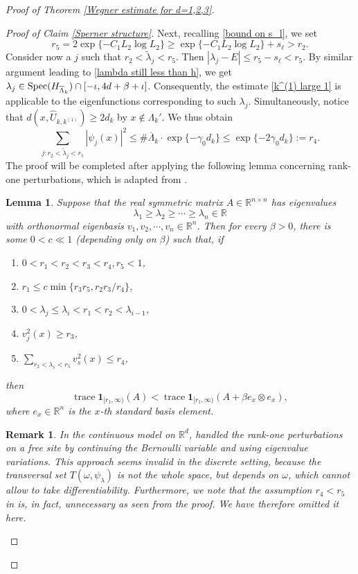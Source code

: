 \documentclass[11pt,reqno,UTF8,twoside]{amsart}
\newcommand{\R}{\mathbb{R}}
\newcommand{\spec}{{\rm Spec}}
\newcommand{\barLambda}{\overline{\Lambda}}
\newcommand{\wtlambda}{\widetilde{\lambda}}
\newtheorem{lem}[thm]{Lemma}
\newtheorem{rmk}{\bf Remark}[section]
\theoremstyle{definition}
\numberwithin{equation}{section}
\begin{document}
\begin{proof}[Proof of Theorem \ref{Wegner estimate for d=1,2,3}]
\begin{proof}[Proof of Claim \ref{Sperner structure}]
Next, recalling \eqref{bound on s_l}, we set 
\begin{equation}\label{r_5}
  r_5= 2\exp\{-C_1 L_2 \log L_2\}\geq \exp\{-C_1 L_2 \log L_2\}+s_\ell > r_2.
\end{equation}
Consider now  a $j$ such that $r_2<\wtlambda_j<r_5$. Then $|\lambda_j-E|\leq r_5-s_{\ell}<r_5$. 
By  similar argument leading  to \eqref{lambda still less than h}, we get   $\lambda_j\in \spec(H_{\barLambda_k})\cap[-\iota,4d+\beta+\iota]$.
Consequently, the estimate \eqref{k^(1) large 1} is applicable to the eigenfunctions corresponding to such $\lambda_j$. Simultaneously, notice that $d(x,\widehat{U}_{k,k^{(1)}})\geq 2d_k$ by $x\notin \Lambda_k'$. We thus obtain 
\begin{equation}\label{r_4}
      \sum_{j:r_2<\wtlambda_j<r_5}|\psi_j(x)|^2 \leq \# \barLambda_k \cdot \exp\{-\gamma_0 d_k\}\leq \exp\{-2\gamma_0 d_k\}:= r_4.
\end{equation}
The proof will be completed after applying the following lemma concerning rank-one perturbations, which is adapted from \cite[Lemma 5.1]{DS20}.
\begin{lem}\label{rank-one perturbation}
Suppose that  the real symmetric matrix \( A \in  \mathbb{R}^{n\times n}  \) has eigenvalues  
\[
\lambda_1 \geq \lambda_2 \geq \cdots \geq \lambda_n \in \mathbb{R}
\]  
with orthonormal eigenbasis \( v_1, v_2, \cdots, v_n \in \mathbb{R}^n \). Then for every $\beta>0$, there is some   $0<c\ll1$ (depending only  on $\beta$) such that, if  
\begin{enumerate}
    \item \(0 < r_1 < r_2 < r_3 < r_4 , r_5 < 1\),  
    \item \(r_1 \leq c \min\{r_3 r_5, r_2 r_3 / r_4\}\),
    \item \(0 < \lambda_j \leq \lambda_i < r_1 < r_2 < \lambda_{i-1}\),  
    \item \(v_{j}^2(x) \geq r_3\),  
    \item \(\displaystyle\sum_{r_2 < \lambda_s < r_5} v_{s}^2(x) \leq r_4\),  
\end{enumerate}
then 
\[
\operatorname{trace} \mathbf{1}_{[r_1, \infty)}(A) < \operatorname{trace} \mathbf{1}_{[r_1, \infty)}(A + \beta e_x \otimes e_x),
\]
where \( e_x \in \mathbb{R}^n \) is the \(x\)-th standard basis element.

\end{lem}
\begin{rmk}
In the continuous model on $\R^d$, \cite{BK05} handled  the rank-one perturbations on a free site by continuing the Bernoulli variable   and   using  eigenvalue variations. This approach seems invalid  in the discrete setting, because the transversal set $T(\omega,\psi_{\lambda})$ is not the whole space, but depends on $\omega$,  which  cannot allow  to take differentiability. 
Furthermore, we note that the assumption $r_4 < r_5$ in \cite[Lemma 5.1]{DS20} is, in fact, unnecessary as seen from the  proof.  We have therefore omitted it here.
\end{rmk}


\end{proof}
\end{proof}
\end{document}
